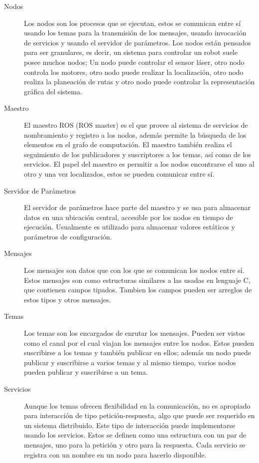 \begin{description}
\item[Nodos]
{
Los nodos son los procesos que se ejecutan, estos se comunican entre sí usando los temas para la transmisión de los mensajes, usando invocación de servicios y usando el servidor de parámetros. Los nodos están pensados para ser granulares, es decir, un sistema para controlar un robot suele posee muchos nodos; Un nodo puede controlar el sensor láser, otro nodo controla los motores, otro nodo puede realizar la localización, otro nodo realiza la planeación de rutas y otro nodo puede controlar la representación gráfica del sistema.
}
\item[Maestro]
{
El maestro ROS (ROS master) es el que provee al sistema de servicios de nombramiento  y registro a los nodos, además permite la búsqueda de los elementos en el grafo de computación. El maestro también realiza el seguimiento de los publicadores y suscriptores a los temas, así como de los servicios. El papel del maestro es permitir a los nodos encontrarse el uno al otro y una vez localizados, estos se pueden comunicar entre sí.
}
\item[Servidor de Parámetros]
{
El servidor de parámetros hace parte del maestro y se usa para almacenar datos en una ubicación central, accesible por los nodos en tiempo de ejecución. Usualmente es utilizado para almacenar valores estáticos y parámetros de configuración.
}
\item[Mensajes]
{
Los mensajes son datos que con los que se comunican los nodos entre sí. Estos mensajes son como estructuras similares a las usadas en lenguaje C, que contienen campos tipados. Tambien los campos pueden ser arreglos de estos tipos y otros mensajes.
}

\item[Temas]
{
Los temas son los encargados de enrutar los mensajes. Pueden ser vistos como el canal por el cual viajan los mensajes entre los nodos. Estos pueden suscribirse a los temas y también publicar en ellos; además un nodo puede publicar y suscribirse a varios temas y al mismo tiempo, varios nodos pueden publicar y suscribirse a un tema.
}
\item[Servicios]
{
Aunque los temas ofrecen flexibilidad en la comunicación, no es apropiado para interacción de tipo petición-respuesta, algo que puede ser requerido en un sistema distribuido. Este tipo de interacción puede implementarse usando los servicios. Estos se definen como una estructura con un par de mensajes, uno para la petición y otro para la respuesta. Cada servicio se registra con un nombre en un nodo para hacerlo disponible.
}
\end{description}

